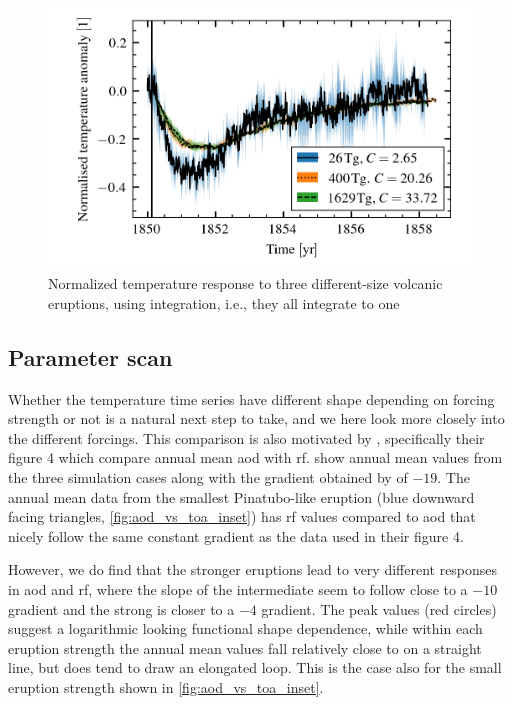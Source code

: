 \documentclass[twocol]{ametsocV5}
\begin{document}
\begin{figure}[t]
  \begin{center}
    \includegraphics[width=0.95\linewidth]{figures/compare-waveform-integrate.png}
  \end{center}
  \caption{Normalized temperature response to three different-size volcanic eruptions,
    using integration, i.e., they all integrate to one}%
  \label{fig:temp_norm_int}
\end{figure}

\subsection{Parameter scan}

Whether the temperature time series have different shape depending on forcing strength
or not is a natural next step to take, and we here look more closely into the different
forcings. This comparison is also motivated by \citet{gregory2016}, specifically their
figure 4 which compare annual mean \acrfull{aod} with \acrfull{rf}.
 show annual mean values from the three simulation cases along
with the gradient obtained by \citet{gregory2016} of \(-19\). The annual mean data from
the smallest Pinatubo-like eruption (blue downward facing triangles,
\cref{fig:aod_vs_toa_inset}) has \acrshort{rf} values compared to \acrshort{aod} that
nicely follow the same constant gradient as the \citet{gregory2016} data used in their
figure 4.

However, we do find that the stronger eruptions lead to very different responses in
\acrshort{aod} and \acrshort{rf}, where the slope of the intermediate seem to follow
close to a \( -10 \) gradient and the strong is closer to a \( -4 \) gradient. The peak
values (red circles) suggest a logarithmic looking functional shape dependence, while
within each eruption strength the annual mean values fall relatively close to on a
straight line, but does tend to draw an elongated loop. This is the case also for the
small eruption strength shown in \cref{fig:aod_vs_toa_inset}.
\end{document}
